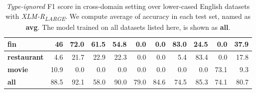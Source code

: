\documentclass[11pt,a4paper]{article}
\begin{document}
\begin{table*}[ht]
\begin{tabular}{l|rrrrrrrrr|r}
\textbf{fin}        & 46                 & 72.0             & 61.5          & 54.8          & 0.0               & 0.0               & 83.0           & 24.5                & 0.0              & 37.9         \\\hline
\textbf{restaurant} & 4.6                & 21.7           & 22.9          & 22.3          & 0.0               & 0.0               & 5.4          & 83.4                & 0.0              & 17.8         \\\hline
\textbf{movie}      & 10.9               & 0.0              & 0.0             & 0.0             & 0.0               & 0.0               & 0.0            & 0.0                   & 73.1           & 9.3          \\\hline\hline
\textbf{all}        & 88.5               & 92.1           & 58.0            & 90.0            & 79.0              & 84.6            & 74.5         & 85.3                & 74.1           & 80.7        \\\hline
\end{tabular}
\caption{\label{app:cross-domain-large-lower}
\textit{Type-ignored} F1 score in cross-domain setting over lower-cased English datasets with {\it XLM-R\textsubscript{LARGE}}.
We compute average of accuracy in each test set, named as {\bf avg}. The model trained on all datasets listed here, is shown as {\bf all}.}
\end{table*}
\end{document}
